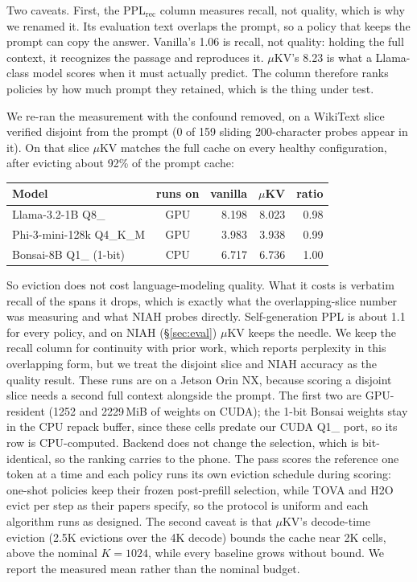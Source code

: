 \documentclass[sigconf, anonymous=false, screen=true]{acmart}
\newcommand{\ub}{\_\allowbreak}
\begin{document}
Two caveats. First, the PPL$_\text{rec}$ column measures recall, not quality, which is why we renamed it. Its evaluation text overlaps the prompt, so a policy that keeps the prompt can copy the answer. Vanilla's 1.06 is recall, not quality: holding the full context, it recognizes the passage and reproduces it. $\mu$KV's 8.23 is what a Llama-class model scores when it must actually predict. The column therefore ranks policies by how much prompt they retained, which is the thing under test.

We re-ran the measurement with the confound removed, on a WikiText slice verified disjoint from the prompt (0 of 159 sliding 200-character probes appear in it). On that slice $\mu$KV matches the full cache on every healthy configuration, after evicting about 92\% of the prompt cache:

\begin{center}\small
\begin{tabular}{l c r r r}
\toprule
\textbf{Model} & \textbf{runs on} & \textbf{vanilla} & \textbf{$\mu$KV} & \textbf{ratio} \\
\midrule
Llama-3.2-1B Q8\ub 0    & GPU & 8.198 & 8.023 & 0.98 \\
Phi-3-mini-128k Q4\ub K\ub M & GPU & 3.983 & 3.938 & 0.99 \\
Bonsai-8B Q1\ub 0 (1-bit) & CPU & 6.717 & 6.736 & 1.00 \\
\bottomrule
\end{tabular}
\end{center}

\noindent So eviction does not cost language-modeling quality. What it costs is verbatim recall of the spans it drops, which is exactly what the overlapping-slice number was measuring and what NIAH probes directly. Self-generation PPL is about 1.1 for every policy, and on NIAH (\S\ref{sec:eval}) $\mu$KV keeps the needle. We keep the recall column for continuity with prior work, which reports perplexity in this overlapping form, but we treat the disjoint slice and NIAH accuracy as the quality result. These runs are on a Jetson Orin NX, because scoring a disjoint slice needs a second full context alongside the prompt. The first two are GPU-resident (1252 and 2229\,MiB of weights on CUDA); the 1-bit Bonsai weights stay in the CPU repack buffer, since these cells predate our CUDA Q1\ub 0 port, so its row is CPU-computed. Backend does not change the selection, which is bit-identical, so the ranking carries to the phone. The pass scores the reference one token at a time and each policy runs its own eviction schedule during scoring: one-shot policies keep their frozen post-prefill selection, while TOVA and H2O evict per step as their papers specify, so the protocol is uniform and each algorithm runs as designed. The second caveat is that $\mu$KV's decode-time eviction (2.5K evictions over the 4K decode) bounds the cache near 2K cells, above the nominal $K{=}1024$, while every baseline grows without bound. We report the measured mean rather than the nominal budget.
\end{document}
